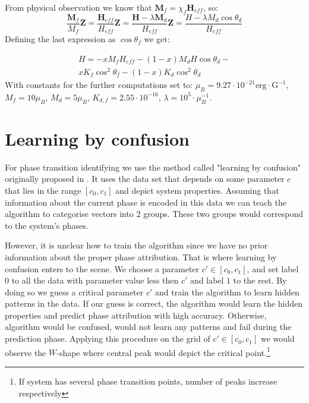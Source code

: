 From physical observation we know that $\bm{M}_f = \chi_f \bm{H}_{eff}$, so:
\begin{equation}
    \frac{\bm{M}_f}{M_f}\bm{Z} =
    \frac{\bm{H}_{eff}}{H_{eff}}\bm{Z} =
    \frac{\bm{H} - \lambda\bm{M}_d}{H_{eff}}\bm{Z}=
    \frac{H - \lambda M_d \cos\theta_d}{H_{eff}}
\end{equation}
Defining the last expression as $\cos\theta_f$ we get:

\begin{multline}
    H = -xM_fH_{eff} -
    (1-x)M_dH\cos\theta_d -\\
    xK_f\cos^2\theta_f -
    (1-x)K_d\cos^2\theta_d
\end{multline}
With constants for the further computations set to:
    $\mu_{B} = 9.27\cdot10^{-21} \mathrm{erg}\cdot \mathrm{G}^{-1}$,
    $M_{f}=10 \mu_{B}$,
    $M_{d}=5 \mu_{B}$,
    $K_{d,f} = 2.55 \cdot 10^{-16}$,
    $\lambda = 10^5 \cdot \mu_{B}^{-1}$.



\section{Learning by confusion}
For phase transition identifying we use the method called "learning by confusion" originally proposed in \cite{VanNieuwenburg2017}.
It uses the data set that depends on some parameter $c$ that lies in the range $[c_0, c_1]$ and depict system properties.
Assuming that information about the current phase is encoded in this data we can teach the algorithm to categorise vectors into 2 groups.
These two groups would correspond to the system's phases.

However, it is unclear how to train the algorithm since we have no prior information about the proper phase attribution.
That is where learning by confusion enters to the scene.
We choose a parameter $c'\in[c_0, c_1]$, and set label $0$ to all the data with parameter value less then $c'$ and label $1$ to the rest.
By doing so we guess a critical parameter $c'$ and train the algorithm to learn hidden patterns in the data.
If our guess is correct, the algorithm would learn the hidden properties and predict phase attribution with high accuracy.
Otherwise, algorithm would be confused, would not learn any patterns and fail during the prediction phase.
Applying this procedure on the grid of $c'\in[c_0, c_1]$ we would observe the $W$-shape where central peak would depict the critical point.\footnote{If system has several phase transition points, number of peaks increase respectively}

